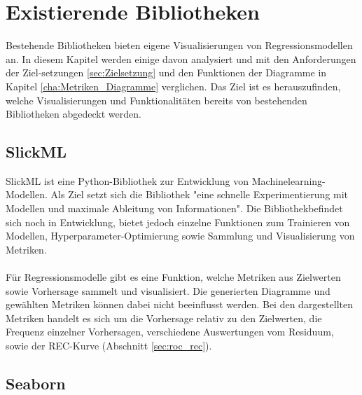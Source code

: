 \chapter{Existierende Bibliotheken}
\label{cha:existirende_bibliotheken}

Bestehende Bibliotheken bieten eigene Visualisierungen von Regressionsmodellen an. In diesem Kapitel werden einige davon analysiert und mit den Anforderungen der Ziel-setzungen \ref{sec:Zielsetzung} und den Funktionen der Diagramme in Kapitel \ref{cha:Metriken_Diagramme} verglichen. Das Ziel ist es herauszufinden, welche Visualisierungen und Funktionalitäten bereits von bestehenden Bibliotheken abgedeckt werden.

\section{SlickML}
\label{sec:SlickML}
SlickML \parencite{slickml2020} ist eine Python-Bibliothek zur Entwicklung von Machinelearning-Modellen. Als Ziel setzt sich die Bibliothek "eine schnelle Experimentierung mit Modellen und maximale Ableitung von Informationen". Die Bibliothek\linebreak befindet sich noch in Entwicklung, bietet jedoch einzelne Funktionen zum Trainieren von Modellen, Hyperparameter-Optimierung sowie Sammlung und Visualisierung von Metriken.\\\\
\noindent Für Regressionsmodelle gibt es eine Funktion, welche Metriken aus Zielwerten sowie Vorhersage sammelt und visualisiert. Die generierten Diagramme und gewählten Metriken können dabei nicht beeinflusst werden. Bei den dargestellten Metriken handelt es sich um die Vorhersage relativ zu den Zielwerten, die Frequenz einzelner Vorhersagen, verschiedene Auswertungen vom Residuum, sowie der REC-Kurve (Abschnitt \ref{sec:roc_rec}).


\section{Seaborn}
\label{sec:seaborn}

